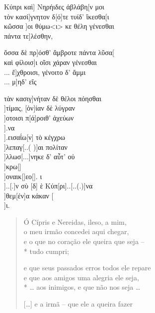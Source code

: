 \begin{gkverse}
Κύπρι καὶ] Νηρήιδες ἀβλάβη[ν μοι\\
		τὸν κασί]γνητον δ[ό]τε τυίδ’ ἴκεσθα[ι\\
κὤσσα ]οι θύμω<ι> κε θέλη γένεσθαι\\
πάντα τε]λέσθην,

ὄσσα δὲ πρ]όσθ’ ἄμβροτε πάντα λῦσα[\\
καὶ φίλοισ]ι οῖσι χάραν γένεσθαι\\
... ἔ]χθροισι, γένοιτο δ’ ἄμμι\\
... μ]ηδ’ εἴς

τὰν κασιγ]νήταν δὲ θέλοι πόησθαι\\
 ]τίμας, [ὀν]ίαν δὲ λύγραν\\
 ]οτοισι π[ά]ροιθ’ ἀχεύων\\
 ].να\\
 ].εισαΐω[ν] τὸ κέγχρω\\
  ]λεπαγ[..(  )]αι πολίταν\\
  ]λλωσ[...]νηκε δ’ αὖτ’ οὐ\\
 ]κρω[]\\
 ]οναικ[\quad]εο[\quad]. ι\\
 ]..[.]ν σὺ [δ] ὲ Κύπ[ρι]..[..(.)]να\\
       ]θεμ[έν]α κάκαν [\\
	       ]ι.	
\end{gkverse}

\begin{verse}
Ó Cípris e Nereidas, ileso, a mim,\\
o meu irmão concedei aqui chegar,\\
e o que no coração ele queira que seja --\\*
tudo cumpri;

e que seus passados erros todos ele repare\\
e que aos amigos uma alegria ele seja,\\*
\ldots{} aos inimigos, e que não nos seja \ldots{}

[\ldots{}] e a irmã -- que ele a queira fazer
\end{verse}

